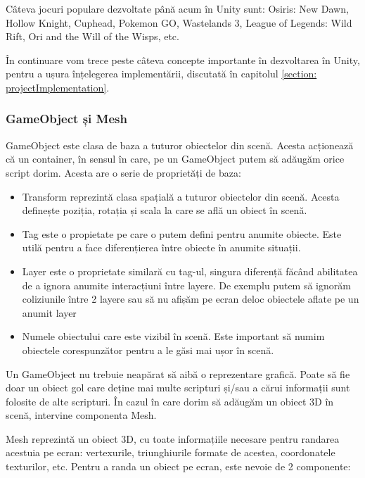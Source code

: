 \documentclass[12pt, a4paper]{article}
\begin{document}
	Câteva jocuri populare dezvoltate până acum în Unity sunt: Osiris: New Dawn, Hollow Knight, Cuphead, Pokemon GO, Wastelands 3, League of Legends: Wild Rift, Ori and the Will of the Wisps, etc.
	\newline
	
	În continuare vom trece peste câteva concepte importante în dezvoltarea în Unity, pentru a ușura înțelegerea implementării, discutată în capitolul \ref{section: projectImplementation}.
	
	
	
	
	\subsubsection{GameObject și Mesh}
	
	GameObject este clasa de baza a tuturor obiectelor din scenă. Acesta acționează că un container, în sensul în care, pe un GameObject putem să adăugăm orice script dorim. Acesta are o serie de proprietăți de baza:
	
	\begin{itemize}
		\item Transform reprezintă clasa spațială a tuturor obiectelor din scenă. Acesta definește poziția, rotația și scala la care se află un obiect în scenă.
		\item Tag este o propietate pe care o putem defini pentru anumite obiecte. Este utilă pentru a face diferențierea între obiecte în anumite situații. 
		\item Layer este o proprietate similară cu tag-ul, singura diferență făcând abilitatea de a ignora anumite interacțiuni între layere. De exemplu putem să ignorăm coliziunile între 2 layere sau să nu afișăm pe ecran deloc obiectele aflate pe un anumit layer
		\item Numele obiectului care este vizibil în scenă. Este important să numim obiectele corespunzător pentru a le găsi mai ușor în scenă.
	\end{itemize}
	
	Un GameObject nu trebuie neapărat să aibă o reprezentare grafică. Poate să fie doar un obiect gol care deține mai multe scripturi și/sau a cărui informații sunt folosite de alte scripturi. În cazul în care dorim să adăugăm un obiect 3D în scenă, intervine componenta Mesh.
	\newline
	
	Mesh reprezintă un obiect 3D, cu toate informațiile necesare pentru randarea acestuia pe ecran: vertexurile, triunghiurile formate de acestea, coordonatele texturilor, etc. Pentru a randa un obiect pe ecran, este nevoie de 2 componente:
	
\end{document}
